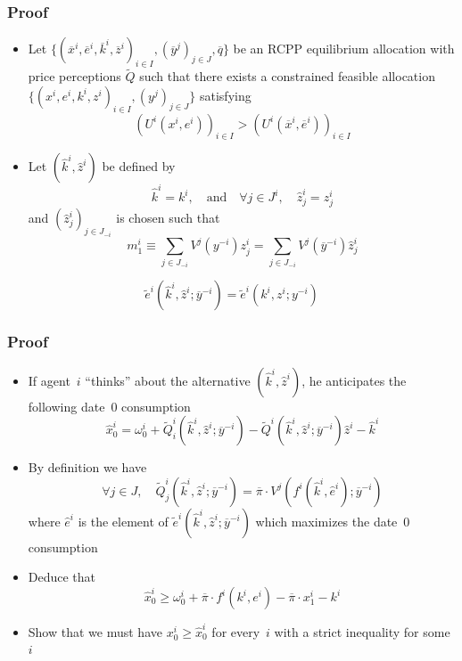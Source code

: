 \documentclass[blue]{beamer}
\def\geq{\geqslant}
\def\et{\quad \textrm{and} \quad}
\theoremstyle{definition}
\theoremstyle{example}
\begin{document}

\begin{frame}\frametitle{Proof}

\begin{itemize}
\item Let $\{(\overline{x}^i,\overline{e}^i,\overline{k}^i,\overline{z}^i)_{i\in I},(\overline{y}^j)_{j\in J},\overline{q}\}$ be an RCPP equilibrium allocation with price perceptions $\widetilde{Q}$
such that there exists a constrained feasible allocation $\{(x^i,e^i,k^i,z^i)_{i\in I},(y^j)_{j\in J}\}$ satisfying
\[
(U^i(x^i,e^i))_{i\in I} > (U^i(\overline{x}^i,\overline{e}^i))_{i\in I}
\]
\item Let $(\widehat{k}^i,\widehat{z}^i)$ be defined by
\[
\widehat{k}^i = k^i, \et \forall j\in J^i,\quad \widehat{z}^i_j = z^i_j
\]
and $(\widehat{z}^i_j)_{j\in J_{-i}}$ is chosen such that
\[
m^i_1 \equiv \sum_{j\in J_{-i}} V^j(y^{-i}) z^i_j = \sum_{j\in J_{-i}} V^j(\overline{y}^{-i}) \widehat{z}^i_j
\]
\end{itemize}

\begin{lemma}
\[
\widetilde{e}^i(\widehat{k}^i,\widehat{z}^i;\overline{y}^{-i}) = \widetilde{e}^i(k^i,z^i;y^{-i})
\]
\end{lemma}

\end{frame}


\begin{frame}\frametitle{Proof}

\begin{itemize}
\item If agent~$i$ ``thinks'' about the alternative $(\widehat{k}^i,\widehat{z}^i)$, he anticipates the following date~$0$ consumption
\[
\widehat{x}^i_0 = \omega^i_0 + \widetilde{Q}^i_i(\widehat{k}^i,\widehat{z}^i;\overline{y}^{-i}) - \widetilde{Q}^i(\widehat{k}^i,\widehat{z}^i;\overline{y}^{-i}) \widehat{z}^i - \widehat{k}^i
\]
\item By definition we have
\[
\forall j\in J, \quad \widetilde{Q}^i_j(\widehat{k}^i,\widehat{z}^i;\overline{y}^{-i}) = \overline{\pi} \cdot V^j(f^i(\widehat{k}^i,\widehat{e}^i);\overline{y}^{-i})
\]
where $\widehat{e}^i$ is the element of $\widetilde{e}^i(\widehat{k}^i,\widehat{z}^i;\overline{y}^{-i})$ which maximizes the date~$0$ consumption
\item Deduce that
\[
\widehat{x}^i_0 \geq \omega^i_0 + \overline{\pi} \cdot f^i(k^i,e^i) - \overline{\pi} \cdot x^i_1 - k^i
\]
\item Show that we must have $x^i_0 \geq \widehat{x}^i_0$ for every~$i$ with a strict inequality for some~$i$
\end{itemize}

\end{frame}
\end{document}
